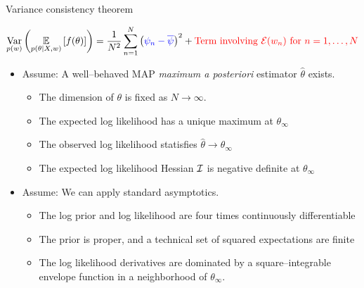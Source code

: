 \begin{frame}[t]{Variance consistency theorem}

%
\begin{align*}
    \underset{p(w)}{\mathrm{Var}}\left(\underset{p(\theta \vert X, w)}{\mathbb{E}}\left[f(\theta)\right]\right)
    = 
    \frac{1}{N^2} \sum_{n=1}^N \left(
        \textcolor{blue}{\psi_n - \overline{\psi}}
    \right)^2 +
    \textcolor{red}{\textrm{Term involving }
        \textcolor{red}{\mathcal{E}}(w_n)
        \textrm{ for }n =1,\dots,N
    }
\end{align*}
%
\def\thetatrue{\theta_{\infty}}
\def\thetahat{\hat\theta}


\def\normdist{\mathcal{N}}

\def\gcovtrue{V^g}
\def\gcovij{V^{\mathrm{IJ}}}

\pause
%
\begin{itemize}
    \item Assume: A well--behaved MAP \textit{maximum a posteriori} estimator $\thetahat$ exists.
    \begin{itemize}
        \item The dimension of $\theta$ is fixed as $N \rightarrow \infty$.
        \item The expected log likelihood has a unique maximum at $\thetatrue$
        \item The observed log likelihood statisfies $\thetahat \rightarrow \thetatrue$
        \item The expected log likelihood Hessian $\mathcal{I}$ is negative definite at $\thetatrue$ 
    \end{itemize}
    \item Assume: We can apply standard asymptotics.
    \begin{itemize}
    \item The log prior and log likelihood are four times continuously differentiable
    \item The prior is proper, and a technical set of squared expectations are finite
    \item The log likelihood derivatives are dominated by a square--integrable envelope function in a
          neighborhood of $\theta_\infty$.
    \end{itemize}
\end{itemize}
%
\pause


\end{frame}
